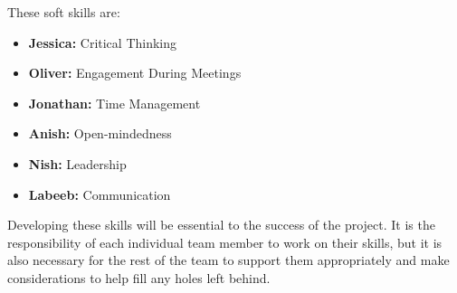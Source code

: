 \documentclass[12pt, titlepage]{article}
\begin{document}
\begin{enumerate}
These soft skills are:
	\begin{itemize}
	\item \textbf{Jessica:} Critical Thinking
	\item \textbf{Oliver:} Engagement During Meetings
	\item \textbf{Jonathan:} Time Management
	\item \textbf{Anish:} Open-mindedness
	\item \textbf{Nish:} Leadership
	\item \textbf{Labeeb:} Communication
	\end{itemize}

Developing these skills will be essential to the success of the project. It is the responsibility of each individual team member to work on their skills, but it is also necessary for the rest of the team to support them appropriately and make considerations to help fill any holes left behind.
	

\end{enumerate}
\end{document}

